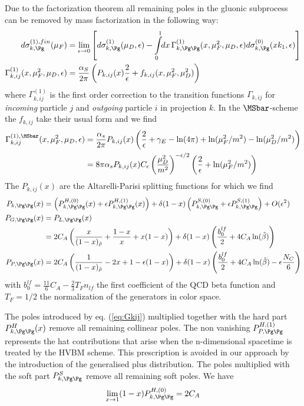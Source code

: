 Due to the factorization theorem \cite{Collins:1985gm} all remaining poles in the gluonic subprocess can be removed by mass factorization in the following way:
\begin{align}
d\sigma_{k,\Pg}^{(1),fin}(\mu_F) &= \lim_{\epsilon\rightarrow 0}\left[d\sigma_{k,\Pg}^{(1)}(\mu_D,\epsilon) -\int\limits_0^1\!\!dx\,\Gamma_{k,\Pg\Pg}^{(1)}(x,\mu_F^2,\mu_D,\epsilon) d\sigma_{k,\Pg}^{(0)}(xk_1,\epsilon) \right]\\
\Gamma_{k,ij}^{(1)}(x,\mu_F^2,\mu_D,\epsilon) &= \frac{\alpha_S}{2\pi}\left(P_{k,ij}(x)\frac{2}{\epsilon} + f_{k,ij}(x,\mu_F^2,\mu_D^2)\right)
\end{align}
where $\Gamma_{k,ij}^{(1)}$ is the first order correction to the transition functions $\Gamma_{k,ij}$ for \textit{incoming} particle $j$ and \textit{outgoing} particle $i$ in projection $k$. In the $\MSbar$-scheme the $f_{k,ij}$ take their usual form and we find
\begin{align}
\Gamma_{k,ij}^{(1),\MSbar}(x,\mu_F^2,\mu_D,\epsilon) &= \frac{\alpha_s}{2\pi}P_{k,ij}(x)\left(\frac{2}{\epsilon} +\gamma_E - \ln(4\pi) + \ln(\mu_F^2/m^2) - \ln(\mu_D^2/m^2)\right)\\
 &= 8\pi\alpha_s P_{k,ij}(x) C_\epsilon \left(\frac{\mu_D^2}{m^2}\right)^{-\epsilon/2} \left(\frac{2}{\epsilon} + \ln(\mu_F^2/m^2)\right) \label{eq:Gkij}
\end{align}
The $P_{k,ij}(x)$ are the Altarelli-Parisi splitting functions for which we find\cite{Altarelli:1977zs,Vogelsang:1995vh,epub29831}
\begin{align}
P_{k,\Pg\Pg}(x) &= \left(P_{k,\Pg\Pg}^{H,(0)}(x) + \epsilon P_{k,\Pg\Pg}^{H,(1)}(x)\right) + \delta(1-x)\left(P_{k,\Pg\Pg}^{S,(0)} + \epsilon P_{k,\Pg\Pg}^{S,(1)}\right) + O(\epsilon^2)\\
P_{G,\Pg\Pg}(x) &= P_{L,\Pg\Pg}(x)\\
 &= 2C_A\left(\frac{x}{(1-x)_{\tilde\rho}} + \frac{1-x}{x} + x(1-x)\right) + \delta(1-x) \left(\frac{b_0^{lf}}{2} + 4C_A\ln(\tilde\beta)\right)\\
P_{P,\Pg\Pg}(x) &= 2C_A\left(\frac{1}{(1-x)_{\tilde\rho}} - 2x + 1 - \epsilon(1-x)\right) + \delta(1-x) \left(\frac{b_0^{lf}}{2} + 4C_A\ln(\tilde\beta) - \epsilon\frac{N_C}{6}\right)
\end{align}
with $b_0^{lf} = \frac {11} 6 C_A - \frac 2 3 T_F n_{lf}$ the first coefficient of the QCD beta function and $T_F = 1/2$ the normalization of the generators in color space.

The poles introduced by eq. (\ref{eq:Gkij}) multiplied together with the hard part $P_{k,\Pg\Pg}^{H}(x)$ remove all remaining collinear poles. The non vanishing $P_{P,\Pg\Pg}^{H,(1)}$ represents the hat contributions that arise when the n-dimensional spacetime is treated by the HVBM scheme\cite{breitenlohner1977}. This prescription is avoided in our approach by the introduction of the generalised plus distribution. The poles multiplied with the soft part $P_{k,\Pg\Pg}^{S}$ remove all remaining soft poles. We have
\begin{equation}
\lim_{x\rightarrow 1}(1-x)P_{k,\Pg\Pg}^{H,(0)} = 2C_A
\end{equation}


